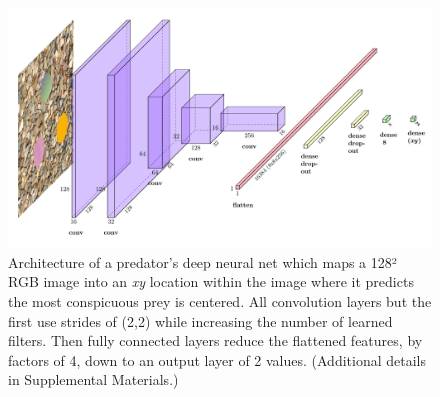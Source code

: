 \documentclass[acmtog]{acmart}
\begin{document}
\begin{figure}
    \includegraphics[width=\columnwidth]{images/predator_cnn.pdf}
    \caption{Architecture of a predator's deep neural net which maps a 128² RGB image into an \textit{xy} location within the image where it predicts the most conspicuous prey is centered. All convolution layers but the first use strides of (2,2) while increasing the number of learned filters. Then fully connected layers reduce the flattened features, by factors of 4, down to an output layer of 2 values. (Additional details in Supplemental Materials.)}
    \label{fig:predator_cnn}
\end{figure}

\end{document}
